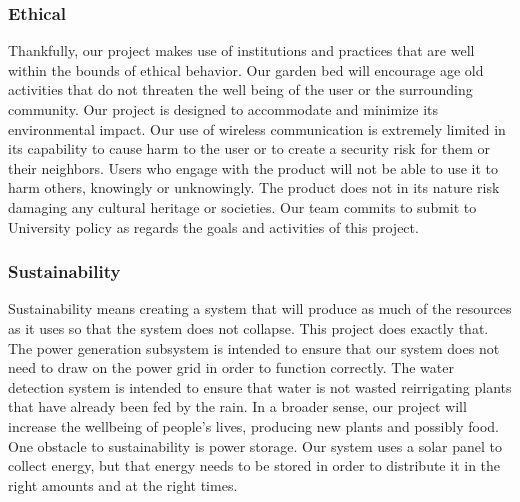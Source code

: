 \subsubsection{Ethical}
Thankfully, our project makes use of institutions and practices that are well within the bounds of ethical behavior. Our garden bed will encourage age old activities that do not threaten the well being of the user or the surrounding community. Our project is designed to accommodate and minimize its environmental impact. Our use of wireless communication is extremely limited in its capability to cause harm to the user or to create a security risk for them or their neighbors. Users who engage with the product will not be able to use it to harm others, knowingly or unknowingly. The product does not in its nature risk damaging any cultural heritage or societies. Our team commits to submit to University policy as regards the goals and activities of this project.

\subsubsection{Sustainability}
Sustainability means creating a system that will produce as much of the resources as it uses so that the system does not collapse. This project does exactly that. The power generation subsystem is intended to ensure that our system does not need to draw on the power grid in order to function correctly. The water detection system is intended to ensure that water is not wasted reirrigating plants that have already been fed by the rain. In a broader sense, our project will increase the wellbeing of people’s lives, producing new plants and possibly food. One obstacle to sustainability is power storage. Our system uses a solar panel to collect energy, but that energy needs to be stored in order to distribute it in the right amounts and at the right times. 
